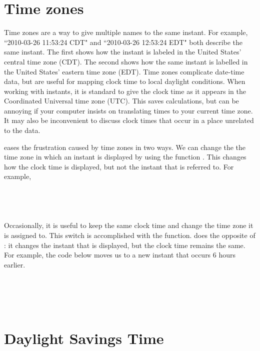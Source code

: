 \documentclass[article]{jss}
\begin{document}
\section{Time zones}
\label{sec:tz}

Time zones are a way to give multiple names to the same instant. For example, ``2010-03-26 11:53:24 CDT" and ``2010-03-26 12:53:24 EDT" both describe the same instant. The first shows how the instant is labeled in the United States' central time zone (CDT). The second shows how the same instant is labelled in the United States' eastern time zone (EDT). Time zones complicate date-time data, but are useful for mapping clock time to local daylight conditions. When working with instants, it is standard to give the clock time as it appears in the Coordinated Universal time zone (UTC).  This saves calculations, but can be annoying if your computer insists on translating times to your current time zone.  It may also be inconvenient to discuss clock times that occur in a place unrelated to the data.

 eases the frustration caused by time zones in two ways. We can change the the time zone in which an instant is displayed by using the function . This changes how the clock time is displayed, but not the instant that is referred to. For example,\\

\\
\\
\\
\\

Occasionally, it is useful to keep the same clock time and change the time zone it is assigned to. This switch is accomplished with the  function.  does the opposite of : it changes the instant that is displayed, but the clock time remains the same. For example, the code below moves us to a new instant that occurs 6 hours earlier.\\

\\
\\
\\
\\


\section{Daylight Savings Time}
\label{sec:DST}
\end{document}
